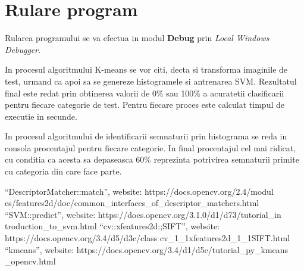 \documentclass[conference]{IEEEtran}
\begin{document}
\section{Rulare program}
Rularea programului se va efectua in modul \textbf{Debug} prin \textit{Local Windows Debugger}.

In procesul algoritmului K-means se vor citi, decta si transforma imaginile de test, urmand ca apoi sa se genereze histogramele si antrenarea SVM. Rezultatul final este redat prin obtinerea valorii de 0\% sau 100\% a acuratetii clasificarii pentru fiecare categorie de test. Pentru fiecare proces este calculat timpul de executie in secunde.

In procesul algoritmului de identificarii semnaturii prin histograma se reda in consola procentajul pentru fiecare categorie. In final procentajul cel mai ridicat, cu conditia ca acesta sa depaseasca 60\% reprezinta potrivirea semnaturii primite cu categoria din care face parte.

\begin{thebibliography}{00}
 ``DescriptorMatcher::match'', website: https://docs.opencv.org/2.4/modul es/features2d/doc/common\_interfaces\_of\_descriptor\_matchers.html
``SVM::predict'', website: https://docs.opencv.org/3.1.0/d1/d73/tutorial\_in
troduction\_to\_svm.html
``cv::xfeatures2d:;SIFT'', website: https://docs.opencv.org/3.4/d5/d3c/class
cv\_1\_1xfeatures2d\_1\_1SIFT.html
``kmeans'', website: https://docs.opencv.org/3.4/d1/d5c/tutorial\_py\_kmeans
\_opencv.html
\end{thebibliography}
\vspace{12pt}
\end{document}
